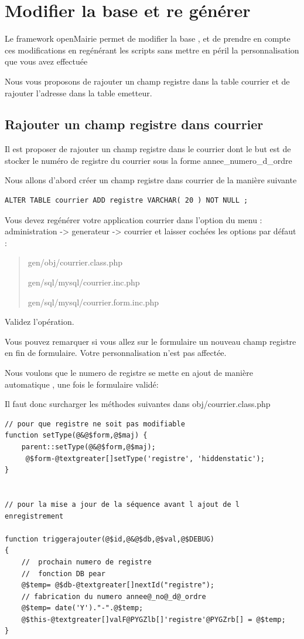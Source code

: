 \documentclass[letterpaper,10pt,french]{manual}
\begin{document}
\hypertarget{modifier-base}{}\section{Modifier la base et re générer}

Le framework openMairie permet de modifier la base , et de prendre en
compte ces modifications en regénérant les scripts sans mettre en péril
la personnalisation que vous avez effectuée

Nous vous proposons de rajouter un champ registre dans la table courrier
et de rajouter l'adresse dans la table emetteur.


\subsection{Rajouter un champ registre dans courrier}

Il est proposer de rajouter un champ registre dans le courrier dont le but
est de stocker le numéro de registre du courrier sous la forme annee\_numero\_d\_ordre

Nous allons d'abord créer un champ registre dans courrier de la manière suivante

\begin{Verbatim}[commandchars=@\[\]]
ALTER TABLE courrier ADD registre VARCHAR( 20 ) NOT NULL ;
\end{Verbatim}

Vous devez regénérer votre application courrier dans l'option du menu : administration -\textgreater{} generateur -\textgreater{} courrier
et laisser cochées les options par défaut :
\begin{quote}

gen/obj/courrier.class.php

gen/sql/mysql/courrier.inc.php

gen/sql/mysql/courrier.form.inc.php
\end{quote}

Validez l'opération.

Vous pouvez remarquer si vous allez sur le formulaire un nouveau champ registre
en fin de formulaire. Votre personnalisation n'est pas affectée.

Nous voulons que le numero de registre se mette en ajout de manière automatique ,
une fois le formulaire validé:

Il faut donc surcharger les méthodes suivantes dans obj/courrier.class.php

\begin{Verbatim}[commandchars=@\[\]]
// pour que registre ne soit pas modifiable
function setType(@&@$form,@$maj) {
    parent::setType(@&@$form,@$maj);
     @$form-@textgreater[]setType('registre', 'hiddenstatic');
}


// pour la mise a jour de la séquence avant l ajout de l enregistrement

function triggerajouter(@$id,@&@$db,@$val,@$DEBUG)
{
    //  prochain numero de registre
    //  fonction DB pear
    @$temp= @$db-@textgreater[]nextId("registre");
    // fabrication du numero annee@_no@_d@_ordre
    @$temp= date('Y')."-".@$temp;
    @$this-@textgreater[]valF@PYGZlb[]'registre'@PYGZrb[] = @$temp;
}
\end{Verbatim}
\end{document}

